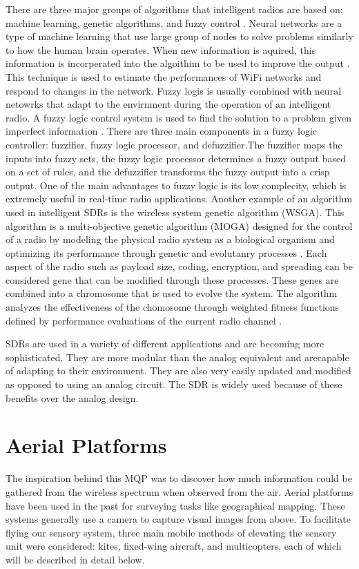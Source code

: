 There are three major groups of algorithms that intelligent radios are based on: machine learning, genetic algorithms, and fuzzy control \cite{amraoui2012intelligent}. Neural networks are a type of machine learning that use large group of nodes to solve problems similarly to how the human brain operates. When new information is aquired, this information is incorperated into the algoithim to be used to improve the output \cite{amini2011universal}. This technique is used to estimate the performances of WiFi networks and respond to changes in the network. Fuzzy logis is usually combined with neural netowrks that adapt to the envirnment during the operation of an intelligent radio. A fuzzy logic control system is used to find the solution to a problem given imperfect information \cite{amraoui2012intelligent}. There are three main components in a fuzzy logic controller: fuzzifier, fuzzy logic processor, and defuzzifier.The fuzzifier maps the inputs into fuzzy sets, the fuzzy logic processor determines a fuzzy output based on a set of rules, and the defuzzifier transforms the fuzzy output into a crisp output. One of the main advantages to fuzzy logic is its low complecity, which is extremely useful in real-time radio applications. Another example of an algorithm used in intelligent SDRs is the wireless system genetic algorithm (WSGA). This algorithm is a multi-objective genetic algorithm (MOGA) designed for the control of a radio by modeling the physical radio system as a biological organism and optimizing its performance through genetic and evolutanry processes \cite{rondeau2004cognitive}. Each aspect of the radio such as payload size, coding, encryption, and spreading can be considered gene that can be modified through these processes. These genes are combined into a chromosome that is used to evolve the system. The algorithm analyzes the effectiveness of the chomosome through weighted fitness functions defined by performance evaluations of the current radio channel \cite{rondeau2004cognitive}.\par
SDRs are used in a variety of different applications and are becoming more sophisticated. They are more modular than the analog equivalent and arecapable of adapting to their environment. They are also very easily updated and modified as opposed to using an analog circuit. The SDR is widely used because of these benefits over the analog design.

\section{Aerial Platforms}
The inspiration behind this MQP was to discover how much information could be gathered from the wireless spectrum when observed from the air. Aerial platforms have been used in the past for surveying tasks like geographical mapping. \cite{geomap_patent} These systems generally use a camera to capture visual images from above. To facilitate flying our sensory system, three main mobile methods of elevating the sensory unit were considered: kites, fixed-wing aircraft, and multicopters, each of which will be described in detail below.

